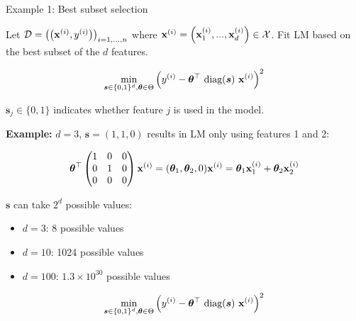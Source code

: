 \begin{vbframe}{Example 1: Best subset selection}

Let $\mathcal{D} = \left(\left(\mathbf{x}^{(i)}, y^{(i)}\right)\right)_{i = 1, ..., n}$ where $\mathbf{x}^{(i)} = \left(\mathbf{x}^{(i)}_1, ..., \mathbf{x}^{(i)}_d\right) \in \mathcal{X}$. Fit LM based on the best subset of the $d$ features. 

\vspace*{-0.5cm}
\begin{eqnarray*}
	\min_{\bm{s} \in \{0, 1\}^d, \bm{\theta} \in \Theta} \left(y^{(i)} - \bm{\theta}^\top ~\text{diag}(\bm{s})~\mathbf{x}^{(i)}\right)^2 \\
\end{eqnarray*}

\vspace*{-0.5cm}

$\bm{s}_j \in \{0, 1\}$ indicates whether feature $j$ is used in the model.

\lz 

\begin{footnotesize}
\textbf{Example:} $d = 3$, $\bm{s} = (1, 1, 0)$ results in LM only using features 1 and 2:

\begin{eqnarray*}
	\bm{\theta}^\top \begin{pmatrix} 1 & 0 & 0 \\
	0 & 1 & 0 \\
	0 & 0 & 0 
	\end{pmatrix} \mathbf{x}^{(i)} = (\bm{\theta}_1, \bm{\theta}_2, 0) \mathbf{x}^{(i)} = \bm{\theta}_1 \mathbf{x}^{(i)}_1 + \bm{\theta}_2 \mathbf{x}^{(i)}_2
\end{eqnarray*}

$\bm{s}$ can take $2^d$ possible values: 

\begin{itemize}
	\item $d = 3$: 8 possible values
	\item $d = 10$: 1024 possible values
	\item $d = 100$: $1.3 \times 10^{30}$ possible values	
\end{itemize}

\end{footnotesize}


\framebreak 

\vspace*{-1cm}

\begin{eqnarray*}
	\min_{\bm{s} \in \{0, 1\}^d, \bm{\theta} \in \Theta} \left(y^{(i)} - \bm{\theta}^\top ~\text{diag}(\bm{s})~\mathbf{x}^{(i)}\right)^2 \\
\end{eqnarray*}


\end{vbframe}
